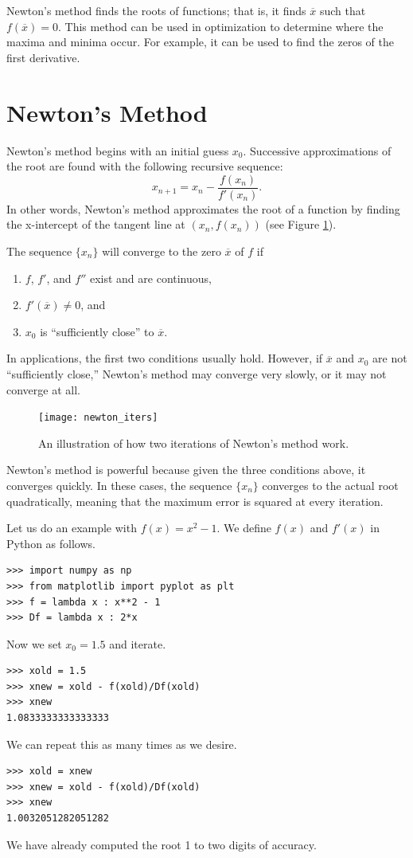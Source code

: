 \label{lab:NewtonsMethod}

Newton's method finds the roots of functions; that is, it finds $\overline{x}$ such that $f\left(\overline{x}\right) = 0$.
This method can be used in optimization to determine where the maxima and minima occur. For example, it can be used to find the zeros of the first derivative.

\section*{Newton's Method}
Newton's method begins with an initial guess $x_0$. 
Successive approximations of the root are found with the following recursive sequence:
\[
x_{n+1} = x_n - \frac{f(x_n)}{f'(x_n)}.
\]
In other words, Newton's method approximates the root of a function by finding the x-intercept of the tangent line at $(x_n, f(x_n))$ (see Figure \ref{fig:newton}).

The sequence $\{x_n\}$ will converge to the zero $\overline{x}$ of $f$ if
\begin{enumerate}
\item $f$, $f'$, and $f''$ exist and are continuous,
\item $f'(\overline{x})\neq0$, and
\item $x_0$ is ``sufficiently close'' to $\overline{x}$.
\end{enumerate}
In applications, the first two conditions usually hold.
However, if $\overline{x}$ and $x_0$ are not ``sufficiently close,'' Newton's method may converge very slowly, or it may not converge at all.

\begin{figure}[h]
\label{fig:newton}
\centering
\texttt{[image: newton\_iters]}
\caption{An illustration of how two iterations of Newton's method work.}
\end{figure}

Newton's method is powerful because given the three conditions above, it converges quickly.
In these cases, the sequence $\{x_n\}$ converges to the actual root quadratically, meaning that the maximum error is squared at every iteration.

Let us do an example with $f(x) = x^2-1$. 
We define $f(x)$ and $f'(x)$ in Python as follows. 
\begin{lstlisting}
>>> import numpy as np
>>> from matplotlib import pyplot as plt
>>> f = lambda x : x**2 - 1
>>> Df = lambda x : 2*x
\end{lstlisting}
Now we set $x_0 = 1.5$ and iterate.
\begin{lstlisting}
>>> xold = 1.5
>>> xnew = xold - f(xold)/Df(xold)
>>> xnew
1.0833333333333333
\end{lstlisting}
We can repeat this as many times as we desire.
\begin{lstlisting}
>>> xold = xnew
>>> xnew = xold - f(xold)/Df(xold)
>>> xnew
1.0032051282051282
\end{lstlisting}
We have already computed the root 1 to two digits of accuracy.


